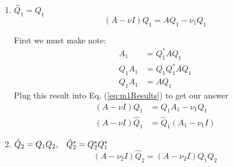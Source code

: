 \documentclass[10pt,letterpaper]{article}
\begin{document}
\begin{enumerate}[(a)]
        \begin{enumerate}[$m=1$: ]
            \item $\hat{Q}_1 = Q_1$
                \begin{equation}
                    \left(A-\nu I\right)Q_1 = AQ_1 - \nu_1Q_1
                    \label{eq:m1Results}
                \end{equation}

                First we must make note:
                \begin{subequations}\begin{align}
                    A_1 &= Q_1^*AQ_1 \\[2mm]
                    Q_1A_1 &= Q_1Q_1^*AQ_1 \\
                    Q_1A_1 &= AQ_1
                \end{align}\end{subequations}
                Plug this result into Eq. (\ref{eq:m1Results}) to get our answer
                \begin{subequations}\begin{align}
                    \left(A-\nu I\right)Q_1 &= Q_1A_1 - \nu_1Q_1 \\
                    \left(A-\nu I\right)\hat{Q}_1 &= \hat{Q}_1\left( A_1 - \nu_1 I \right)
                \end{align}\end{subequations}

            \item $\hat{Q}_2 = Q_1Q_2, \hspace{2ex} \hat{Q}_2^* = Q_2^*Q_1^*$
                \begin{equation}
                    \left(A-\nu_2 I\right)\hat{Q}_2 = \left(A-\nu_2 I\right)Q_1Q_2
                    \label{eq:m1Results}
                \end{equation}


\end{enumerate}
\end{enumerate}
\end{document}
